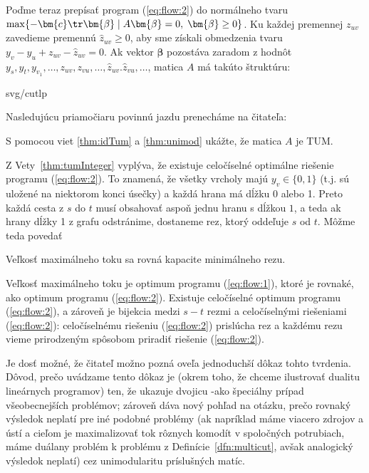 \noindent
Poďme teraz prepísať program (\ref{eq:flow:2}) do normálneho tvaru 
$\max\{-\bm{c}\tr\bm{\beta}\mid A\bm{\beta}=0,\;\bm{\beta}\ge0\}$.
Ku každej premennej $z_{uv}$ zavedieme premennú $\hat{z}_{uv}\ge 0$, aby sme získali
obmedzenia tvaru \hbox{$y_v-y_u+z_{uv}-\hat{z}_{uv}=0$}.
Ak vektor  $\bm{\beta}$  pozostáva zaradom z hodnôt 
$y_s,y_t,y_{v_1},\ldots,z_{uv},z_{vu},\ldots,\hat{z}_{uv}.\hat{z}_{vu},\ldots$, 
matica $A$ má takúto štruktúru:

\begin{myfig}{0.8\textwidth}{svg/cutlp}
\end{myfig}

\noindent
Nasledujúcu priamočiaru povinnú jazdu prenecháme na čitateľa:

\begin{prob}
  S pomocou viet \ref{thm:idTum} a \ref{thm:unimod} ukážte, že matica $A$ je TUM.
\end{prob}


\noindent
Z Vety~\ref{thm:tumInteger} vyplýva, že existuje celočíselné optimálne riešenie programu (\ref{eq:flow:2}).
To znamená, že všetky vrcholy majú $y_v\in\{0,1\}$ (t.j. sú uložené na niektorom konci úsečky)
a každá hrana má dĺžku 0 alebo 1. Preto každá cesta z $s$ do $t$ musí obsahovať aspoň jednu hranu s dĺžkou $1$,
a teda ak hrany dĺžky 1 z grafu odstránime, dostaneme rez, ktorý oddeľuje $s$ od $t$. Môžme teda povedať

\begin{veta}
  Veľkosť maximálneho toku sa rovná kapacite minimálneho rezu.
\end{veta}
\begin{dokaz}
  Veľkosť maximálneho toku je optimum programu (\ref{eq:flow:1}), ktoré je rovnaké, ako optimum
  programu (\ref{eq:flow:2}). Existuje celočíselné optimum programu (\ref{eq:flow:2}), a zároveň
  je bijekcia medzi $s-t$ rezmi a celočíselnými riešeniami  (\ref{eq:flow:2}): celočíselnému riešeniu
  (\ref{eq:flow:2}) prislúcha rez a každému rezu vieme prirodzeným spôsobom priradiť riešenie  (\ref{eq:flow:2}).
\end{dokaz}

\noindent
Je dosť možné, že čitateľ možno pozná oveľa jednoduchší dôkaz tohto tvrdenia. Dôvod, prečo uvádzame tento dôkaz je
(okrem toho, že chceme ilustrovať dualitu lineárnych programov) ten, že ukazuje dvojicu 
\maxflow-\mincut ako špeciálny prípad všeobecnejších problémov; zároveň dáva nový pohľad na otázku, prečo
rovnaký výsledok neplatí pre iné podobné problémy (ak napríklad máme viacero zdrojov a ústí a cieľom je
maximalizovať tok rôznych komodít v spoločných potrubiach, máme duálany problém k problému
\minmulticut z Definície~\ref{dfn:multicut}, avšak analogický výsledok neplatí) cez unimodularitu príslušných matíc.

